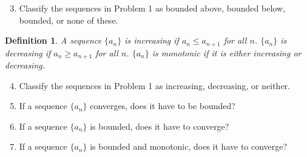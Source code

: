 \documentclass[12pt]{article}
\newtheorem*{defn}{Definition}
\begin{document}
\begin{enumerate}
\setcounter{enumi}{2}
\item Classify the sequences in Problem 1 as bounded above, bounded below, bounded, or none of these.
\end{enumerate}

\bigskip

\pagebreak

\begin{defn} \rm
A sequence $\{a_n\}$ is \emph{increasing} if $a_n\leq a_{n+1}$ for all $n$.
$\{a_n\}$ is \emph{decreasing} if $a_n\geq a_{n+1}$ for all $n$.
 $\{a_n\}$ is \emph{monotonic} if it is either increasing or decreasing.


\end{defn}

\begin{enumerate}
\setcounter{enumi}{3}
\item Classify the sequences in Problem 1 as increasing, decreasing, or neither.


\vfill

\item If a sequence $\{a_n\}$ converges, does it have to be bounded?

\vfill

\item If a sequence $\{a_n\}$ is bounded, does it have to converge?

\vfill

\item If a sequence $\{a_n\}$ is bounded and monotonic, does it have to converge?
\vfill
\thispagestyle{empty}
\end{enumerate}
\end{document}
